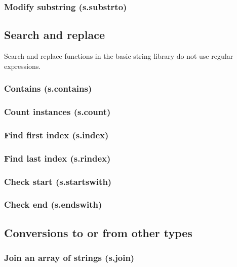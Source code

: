 \documentclass{article}
\theoremstyle{definition}
\begin{document}
\subsubsection{Modify substring (s.substrto)}

\subsection{Search and replace}

Search and replace functions in the basic string library do not use regular expressions.

\subsubsection{Contains (s.contains)}

\subsubsection{Count instances (s.count)}

\subsubsection{Find first index (s.index)}

\subsubsection{Find last index (s.rindex)}

\subsubsection{Check start (s.startswith)}

\subsubsection{Check end (s.endswith)}

\subsection{Conversions to or from other types}

\subsubsection{Join an array of strings (s.join)}
\end{document}
